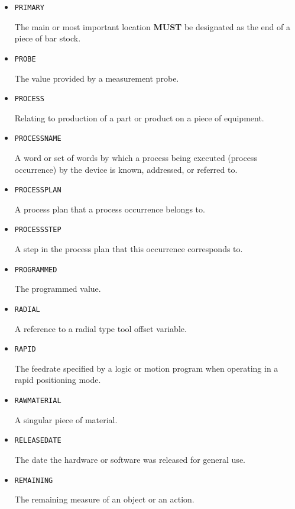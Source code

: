 \begin{itemize}
\item \texttt{PRIMARY}  

The main or most important location \textbf{MUST} be designated as the end of a piece of bar stock.


\item \texttt{PROBE}  

The value provided by a measurement probe.


\item \texttt{PROCESS}  

Relating to production of a part or product on a piece of equipment.


\item \texttt{PROCESS\textunderscore NAME}  

A word or set of words by which a process being executed (process occurrence) by the device is known, addressed, or referred to.



\item \texttt{PROCESS\textunderscore PLAN}  

A process plan that a process occurrence belongs to.


\item \texttt{PROCESS\textunderscore STEP}  

A step in the process plan that this occurrence corresponds to. 


\item \texttt{PROGRAMMED}  

The programmed value.


\item \texttt{RADIAL}  

A reference to a radial type tool offset variable.


\item \texttt{RAPID}  

The feedrate specified by a logic or motion program when operating in a rapid positioning mode.


\item \texttt{RAW\textunderscore MATERIAL}  

A singular piece of material.


\item \texttt{RELEASE\textunderscore DATE}  

The date the hardware or software was released for general use.


\item \texttt{REMAINING}  

The remaining measure of an object or an action.



\end{itemize}
